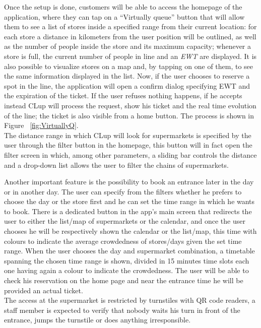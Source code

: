 Once the setup is done, customers will be able to access the homepage of the application, where they can tap on a “Virtually queue” button that will allow them to see a list of stores inside a specified range from their current location: for each store a distance in kilometers from the user position will be outlined, as well as the number of people inside the store and its maximum capacity; whenever a store is full, the current number of people in line and an \textit{EWT} are displayed.\newline  
It is also possible to visualize stores on a map and, by tapping on one of them, to see the same information displayed in the list. Now, if the user chooses to reserve a spot in the line, the application will open a confirm dialog specifying EWT and the expiration of the ticket. If the user refuses nothing happens, if he accepts instead CLup will process the request, show his ticket and the real time evolution of the line; the ticket is also visible from a home button. The process is shown in Figure ~\ref{fig:VirtuallyQ}.\\
The distance range in which CLup will look for supermarkets is specified by the user through the filter button in the homepage, this button will in fact open the filter screen in which, among other parameters, a sliding bar controls the distance and a drop-down list allows the user to filter the chains of supermarkets.\newline

Another important feature is the possibility to book an entrance later in the day or in another day. The user can specify from the filters whether he prefers to choose the day or the store first and he can set the time range in which he wants to book. 
There is a dedicated button in the app’s main screen that redirects the user to either the list/map of supermarkets or the calendar, and once the user chooses he will be respectively shown the calendar or the list/map, this time with colours to indicate the average crowdedness of stores/days given the set time range.
When the user chooses the day and supermarket combination, a timetable spanning the chosen time range is shown, divided in 15 minutes time slots each one having again a colour to indicate the crowdedness. The user will be able to check his reservation on the home page and near the entrance time he will be provided an actual ticket.\\
The access at the supermarket is restricted by turnstiles with QR code readers, a staff member is expected to verify that nobody waits his turn in front of the entrance, jumps the turnstile or does anything irresponsible.

